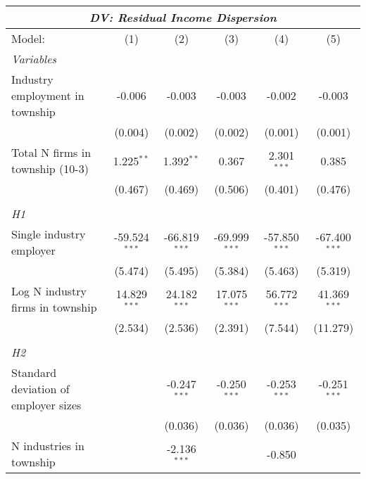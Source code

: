 \begingroup
\centering
\begin{tabular}{lccccc}
   \tabularnewline \multicolumn{6}{c}{\textit{DV: Residual Income Dispersion}} \\ \midrule \midrule
   Model:                               & (1)             & (2)             & (3)             & (4)             & (5)\\  
   \midrule
   \emph{Variables}\\
   Industry employment in township      & -0.006          & -0.003          & -0.003          & -0.002          & -0.003\\   
                                        & (0.004)         & (0.002)         & (0.002)         & (0.001)         & (0.001)\\   
   Total N firms in township (10-3)     & 1.225$^{**}$    & 1.392$^{**}$    & 0.367           & 2.301$^{***}$   & 0.385\\   
                                        & (0.467)         & (0.469)         & (0.506)         & (0.401)         & (0.476)\\   
\hdashline %
\\[0.1ex] %
\emph{H1} \\ 
   Single industry employer             & -59.524$^{***}$ & -66.819$^{***}$ & -69.999$^{***}$ & -57.850$^{***}$ & -67.400$^{***}$\\   
                                        & (5.474)         & (5.495)         & (5.384)         & (5.463)         & (5.319)\\   
   Log N industry firms in township     & 14.829$^{***}$  & 24.182$^{***}$  & 17.075$^{***}$  & 56.772$^{***}$  & 41.369$^{***}$\\   
                                        & (2.534)         & (2.536)         & (2.391)         & (7.544)         & (11.279)\\   
\hdashline %
\\[0.1ex] %
\emph{H2} \\ 
   Standard deviation of employer sizes &                 & -0.247$^{***}$  & -0.250$^{***}$  & -0.253$^{***}$  & -0.251$^{***}$\\   
                                        &                 & (0.036)         & (0.036)         & (0.036)         & (0.035)\\   
   N industries in township             &                 & -2.136$^{***}$  &                 & -0.850          &   \\   

\end{tabular}
